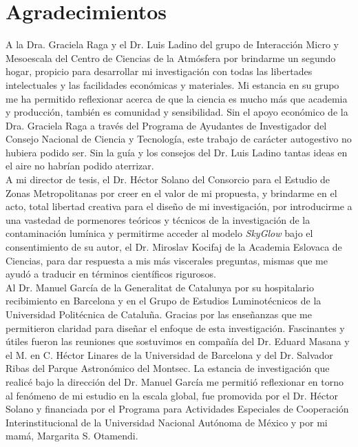 \chapter{Agradecimientos}

A la Dra. Graciela Raga y el Dr. Luis Ladino del grupo de Interacción Micro y Mesoescala del Centro de Ciencias de la Atmósfera por brindarme un segundo hogar, propicio para desarrollar mi investigación con todas las libertades intelectuales y las facilidades económicas y materiales. Mi estancia en su grupo me ha permitido reflexionar acerca de que la ciencia es mucho más que academia y producción, también es comunidad y sensibilidad. Sin el apoyo económico de la Dra. Graciela Raga a través del Programa de Ayudantes de Investigador del Consejo Nacional de Ciencia y Tecnología, este trabajo de carácter autogestivo no hubiera podido ser. Sin la guía y los consejos del Dr. Luis Ladino tantas ideas en el aire no habrían podido aterrizar.\\

A mi director de tesis, el Dr. Héctor Solano del Consorcio para el Estudio de Zonas Metropolitanas por creer en el valor de mi propuesta, y brindarme en el acto, total libertad creativa para el diseño de mi investigación, por introducirme a una vastedad de pormenores teóricos y técnicos de la investigación de la contaminación lumínica y permitirme acceder al modelo \textit{SkyGlow} bajo el consentimiento de su autor, el Dr. Miroslav Kocifaj de la Academia Eslovaca de Ciencias, para dar respuesta a mis más viscerales preguntas, mismas que me ayudó a traducir en términos científicos rigurosos.\\

Al Dr. Manuel García de la Generalitat de Catalunya por su hospitalario recibimiento en Barcelona y en el Grupo de Estudios Luminotécnicos de la Universidad Politécnica de Cataluña. Gracias por las enseñanzas que me permitieron claridad para diseñar el enfoque de esta investigación. Fascinantes y útiles fueron las reuniones que sostuvimos en compañía del Dr. Eduard Masana y el M. en C. Héctor Linares de la Universidad de Barcelona y del Dr. Salvador Ribas del Parque Astronómico del Montsec. La estancia de investigación que realicé bajo la dirección del Dr. Manuel García me permitió reflexionar en torno al fenómeno de mi estudio en la escala global, fue promovida por el Dr. Héctor Solano y financiada por el Programa para Actividades Especiales de Cooperación Interinstitucional de la Universidad Nacional Autónoma de México y por mi mamá, Margarita S. Otamendi.\\

